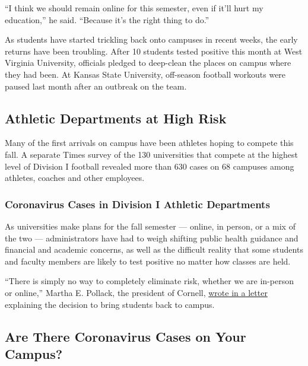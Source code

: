 ``I think we should remain online for this semester, even if it'll hurt
my education,'' he said. ``Because it's the right thing to do.''

As students have started trickling back onto campuses in recent weeks,
the early returns have been troubling. After 10 students tested positive
this month at West Virginia University, officials pledged to deep-clean
the places on campus where they had been. At Kansas State University,
off-season football workouts were paused last month after an outbreak on
the team.

\hypertarget{athletic-departments-at-high-risk}{%
\subsection{Athletic Departments at High
Risk}\label{athletic-departments-at-high-risk}}

Many of the first arrivals on campus have been athletes hoping to
compete this fall. A separate Times survey of the 130 universities that
compete at the highest level of Division I football revealed more than
630 cases on 68 campuses among athletes, coaches and other employees.

\hypertarget{coronavirus-cases-in-division-i-athletic-departments}{%
\subsubsection{Coronavirus Cases in Division I Athletic
Departments}\label{coronavirus-cases-in-division-i-athletic-departments}}

As universities make plans for the fall semester --- online, in person,
or a mix of the two --- administrators have had to weigh shifting public
health guidance and financial and academic concerns, as well as the
difficult reality that some students and faculty members are likely to
test positive no matter how classes are held.

``There is simply no way to completely eliminate risk, whether we are
in-person or online,'' Martha E. Pollack, the president of Cornell,
\href{https://covid.cornell.edu/updates/20200630-reactivate-campus.cfm}{wrote
in a letter} explaining the decision to bring students back to campus.

\hypertarget{are-there-coronavirus-cases-on-your-campus}{%
\subsection{Are There Coronavirus Cases on Your
Campus?}\label{are-there-coronavirus-cases-on-your-campus}}

